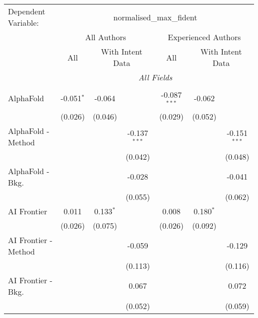 \begingroup
\centering
\begin{tabular}{lcccccc}
   \tabularnewline \midrule \midrule
   Dependent Variable: & \multicolumn{6}{c}{normalised\_max\_fident}\\
 & \multicolumn{3}{c}{All Authors} & \multicolumn{3}{c}{Experienced Authors} \\
\cmidrule(lr){2-4} \cmidrule(lr){5-7}
 & \multicolumn{1}{c}{All} & \multicolumn{2}{c}{With Intent Data} & \multicolumn{1}{c}{All} & \multicolumn{2}{c}{With Intent Data} \\
\cmidrule(lr){2-2} \cmidrule(lr){3-4} \cmidrule(lr){5-5} \cmidrule(lr){6-7}
 & \multicolumn{6}{c}{\textit{All Fields}} \\ \\
   AlphaFold            & -0.051$^{*}$ & -0.064      &                & -0.087$^{***}$ & -0.062      &   \\   
                        & (0.026)      & (0.046)     &                & (0.029)        & (0.052)     &   \\   
   AlphaFold - Method   &              &             & -0.137$^{***}$ &                &             & -0.151$^{***}$\\   
                        &              &             & (0.042)        &                &             & (0.048)\\   
   AlphaFold - Bkg.     &              &             & -0.028         &                &             & -0.041\\   
                        &              &             & (0.055)        &                &             & (0.062)\\   
   AI Frontier          & 0.011        & 0.133$^{*}$ &                & 0.008          & 0.180$^{*}$ &   \\   
                        & (0.026)      & (0.075)     &                & (0.026)        & (0.092)     &   \\   
   AI Frontier - Method &              &             & -0.059         &                &             & -0.129\\   
                        &              &             & (0.113)        &                &             & (0.116)\\   
   AI Frontier - Bkg.   &              &             & 0.067          &                &             & 0.072\\   
                        &              &             & (0.052)        &                &             & (0.059)\\   

\end{tabular}
